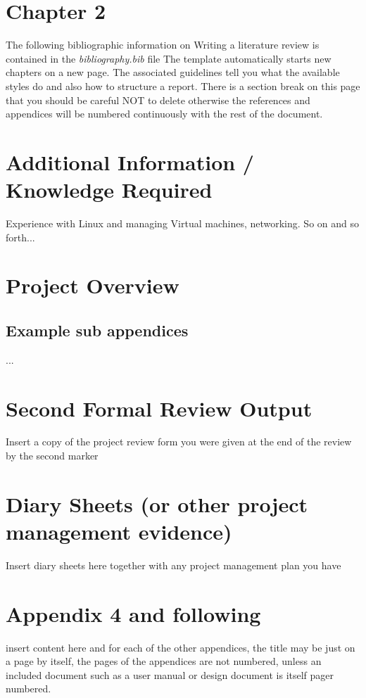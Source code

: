 \documentclass[12pt,a4paper]{article}
\begin{document}
\section{Chapter 2}
The following bibliographic information on Writing a literature review is contained in the \emph{bibliography.bib} file 
The template automatically starts new chapters on a new page.  The associated guidelines tell you what the available styles do and also how to structure a report.
There is a section break on this page that you should be careful NOT to delete otherwise the references and appendices will be numbered continuously with the rest of the document.

\section{Additional Information / Knowledge Required}
Experience with Linux and managing Virtual machines, networking.
So on and so forth...





\newpage
\begin{appendices}
\section{Project Overview}

\begin{subappendices}
\subsection{Example sub appendices}
...
\end{subappendices}

\section{Second Formal Review Output}
Insert a copy of the project review form you were given at the end of the review by the second marker

\section{Diary Sheets (or other project management evidence)}
Insert diary sheets here together with any project management plan you have

\section{Appendix 4 and following}
insert content here and for each of the other appendices, the title may be just on a page by itself, the pages of the appendices are not numbered, unless an included document such as a user manual or design document is itself pager numbered.
\end{appendices}
\end{document}

